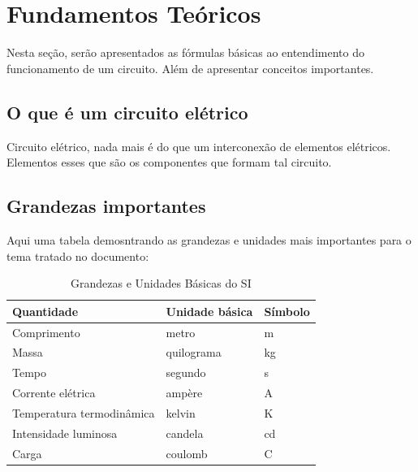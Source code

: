 \section{Fundamentos Teóricos}

Nesta seção, serão apresentados as fórmulas básicas ao entendimento do
funcionamento de um circuito. Além de apresentar conceitos importantes.

\subsection{\textbf{O que é um circuito elétrico}}

Circuito elétrico, nada mais é do que um interconexão de elementos elétricos.
Elementos esses que são os componentes que formam tal circuito.

\subsection{\textbf{Grandezas importantes}}

Aqui uma tabela demosntrando as grandezas e unidades mais importantes para o
tema tratado no documento:
\newline

\begin{table}[H]
	\centering
	\caption{Grandezas e Unidades Básicas do SI}
	\begin{tabular}{m{3cm}m{2cm}m{1.5cm}}
		\hline
		\textbf{Quantidade}       & \textbf{Unidade básica} & \textbf{Símbolo} \\
		\hline
		Comprimento               & metro                   & m                \\ \hline
		Massa                     & quilograma              & kg               \\ \hline
		Tempo                     & segundo                 & s                \\ \hline
		Corrente elétrica         & ampère                  & A                \\ \hline
		Temperatura termodinâmica & kelvin                  & K                \\ \hline
		Intensidade luminosa      & candela                 & cd               \\ \hline
		Carga                     & coulomb                 & C                \\ \hline
	\end{tabular}
\end{table}

